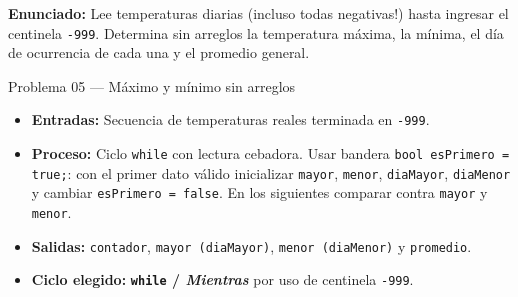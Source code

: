\documentclass[11pt,letterpaper]{article}
\begin{document}
\textbf{Enunciado:} Lee temperaturas diarias (incluso todas negativas!) hasta ingresar el centinela \texttt{-999}. Determina sin arreglos la temperatura máxima, la mínima, el día de ocurrencia de cada una y el promedio general.

\begin{analisis}{Problema 05 --- Máximo y mínimo sin arreglos}
\begin{itemize}
  \item \textbf{Entradas:} Secuencia de temperaturas reales terminada en \texttt{-999}.
  \item \textbf{Proceso:} Ciclo \texttt{while} con lectura cebadora. Usar bandera \texttt{bool esPrimero = true;}: con el primer dato válido inicializar \texttt{mayor}, \texttt{menor}, \texttt{diaMayor}, \texttt{diaMenor} y cambiar \texttt{esPrimero = false}. En los siguientes comparar contra \texttt{mayor} y \texttt{menor}.
  \item \textbf{Salidas:} \texttt{contador}, \texttt{mayor (diaMayor)}, \texttt{menor (diaMenor)} y \texttt{promedio}.
  \item \textbf{Ciclo elegido:} \textbf{\texttt{while} / \textit{Mientras}} por uso de centinela \texttt{-999}.
\end{itemize}
\end{analisis}





\end{document}
